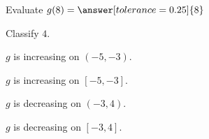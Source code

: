 \documentclass{ximera}
\begin{document}
\begin{exercise}
\begin{question}
Evaluate $g(8) = \answer[tolerance=0.25]{8}$


Classify $4$. \\


\begin{multipleChoice}
\end{multipleChoice}



\end{question}










\begin{question} 


$g$ is increasing on $(-5, -3)$. \\


\begin{multipleChoice}
\end{multipleChoice}




$g$ is increasing on $[-5, -3]$. \\


\begin{multipleChoice}
\end{multipleChoice}





$g$ is decreasing on $(-3, 4)$. \\


\begin{multipleChoice}
\end{multipleChoice}




$g$ is decreasing on $[-3, 4]$. \\


\begin{multipleChoice}
\end{multipleChoice}



\end{question}


















\end{exercise}
\end{document}
